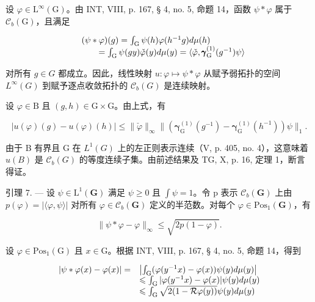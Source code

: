设 \(\varphi\in\mathrm{L}^{\infty}(\mathrm{G})\)。由 INT, VIII, p. 167, § 4, no. 5, 命题 14，函数 \(\psi*\varphi\) 属于 \(\mathcal{C}_{b}(\mathrm{G})\)，且满足

\[
\begin{array}{r l} & {(\psi * \varphi) (g) = \int_ {\mathrm{G}} \psi (h) \varphi (h ^ {- 1} g) d \mu (h)} \\ & {\qquad = \int_ {\mathrm{G}} \psi (g y) \check {\varphi} (y) d \mu (y) = \langle \check {\varphi}, \pmb {\gamma} _ {\mathrm{G}} ^ {(1)} (g ^ {- 1}) \psi \rangle} \end{array}
\]

对所有 \(g \in G\) 都成立。因此，线性映射 \(u: \varphi \mapsto \psi * \varphi\) 从赋予弱拓扑的空间 \(L^{\infty}(G)\) 到赋予逐点收敛拓扑的 \(\mathcal{C}_{b}(G)\) 是连续映射。

设 \(\varphi\in\mathrm{B}\) 且 \((g,h)\in\mathrm{G}\times\mathrm{G}\)。由上式，有

\[
| u (\varphi) (g) - u (\varphi) (h) | \leqslant \| \check {\varphi} \| _ {\infty} \| (\boldsymbol {\gamma} _ {\mathrm{G}} ^ {(1)} (g ^ {- 1}) - \boldsymbol {\gamma} _ {\mathrm{G}} ^ {(1)} (h ^ {- 1})) \psi \| _ {1}.
\]

由于 B 有界且 G 在 \(L^{1}(G)\) 上的左正则表示连续（V, p. 405, no. 4），这意味着 \(u(B)\) 是 \(\mathcal{C}_{b}(G)\) 的等度连续子集。由前述结果及 TG, X, p. 16, 定理 1，断言得证。

引理 7. --- 设 \(\psi \in \mathrm{L}^1 (\mathbf{G})\) 满足 \(\psi \geqslant 0\) 且 \(\int \psi = 1\)。令 p 表示 \(\mathcal{C}_b(\mathbf{G})\) 上由 \(p(\varphi) = |\langle \varphi ,\psi \rangle |\) 对所有 \(\varphi \in \mathcal{C}_b(\mathbf{G})\) 定义的半范数。对每个 \(\varphi \in \mathrm{Pos}_1(\mathbf{G})\)，有

\[
\| \psi * \varphi - \varphi \| _ {\infty} \leqslant \sqrt {2 p (1 - \varphi)}.
\]

设 \(\varphi\in\mathrm{Pos}_{1}(\mathrm{G})\) 且 \(x\in\mathrm{G}\)。根据 INT, VIII, p. 167, § 4, no. 5, 命题 14，得到

\[
\begin{array}{r l} | \psi * \varphi (x) - \varphi (x) | = & \left| \int_ {\mathrm{G}} (\varphi (y ^ {- 1} x) - \varphi (x)) \psi (y) d \mu (y) \right| \\ & \leqslant \int_ {\mathrm{G}} | \varphi (y ^ {- 1} x) - \varphi (x) | \psi (y) d \mu (y) \\ & \leqslant \int_ {\mathrm{G}} \sqrt {2 (1 - \mathcal {R}   \varphi (y))} \psi (y) d \mu (y) \end{array}
\]

